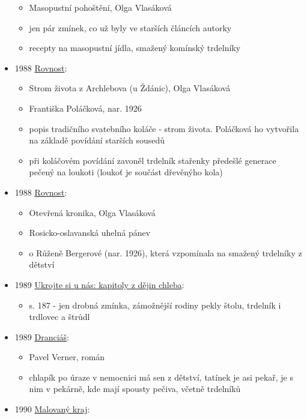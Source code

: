 \begin{itemize}
  \begin{itemize}
  \tightlist
  \item
    Masopustní pohoštění, Olga Vlasáková
  \item
    jen pár zmínek, co už byly ve starších článcích autorky
  \item
    recepty na masopustní jídla, smažený komínský trdelníky
  \end{itemize}
\item
  1988
  \href{https://ndk.cz/uuid/uuid:21bdf290-4ae8-11f0-ace4-005056825209}{Rovnost}:

  \begin{itemize}
  \tightlist
  \item
    Strom života z Archlebova (u Ždánic), Olga Vlasáková
  \item
    Františka Poláčková, nar. 1926
  \item
    popis tradičního svatebního koláče - strom života. Poláčková ho
    vytvořila na základě povídání starších sousedů
  \item
    při koláčovém povídání zavoněl trdelník stařenky předešlé generace
    pečený na loukoti (loukoť je součást dřevěnýho kola)
  \end{itemize}
\item
  1988
  \href{https://ndk.cz/uuid/uuid:bd7a25f0-4acf-11f0-b498-5ef3fc9bb22f}{Rovnost}:

  \begin{itemize}
  \tightlist
  \item
    Otevřená kronika, Olga Vlasáková
  \item
    Rosicko-oslavanská uhelná pánev
  \item
    o Růženě Bergerové (nar. 1926), která vzpomínala na smažený
    trdelníky z dětství
  \end{itemize}
\item
  1989
  \href{https://ceskadigitalniknihovna.cz/uuid/uuid:139c9470-ad04-11e3-9d7d-005056827e51}{Ukrojte
  si u nás: kapitoly z dějin chleba}:

  \begin{itemize}
  \tightlist
  \item
    s. 187 - jen drobná zmínka, zámožnější rodiny pekly štolu, trdelník
    i trdlovec a štrůdl
  \end{itemize}
\item
  1989
  \href{https://ceskadigitalniknihovna.cz/uuid/uuid:5da1a820-f9d2-11e2-9923-005056827e52}{Dranciáš}:

  \begin{itemize}
  \tightlist
  \item
    Pavel Verner, román
  \item
    chlapík po úraze v nemocnici má sen z dětství, tatínek je asi pekař,
    je s nim v pekárně, kde mají spousty pečiva, včetně trdelníků
  \end{itemize}
\item
  1990
  \href{https://ndk.cz/uuid/uuid:78486a30-1a13-11e4-8e0d-005056827e51}{Malovaný
  kraj}:


\end{itemize}
